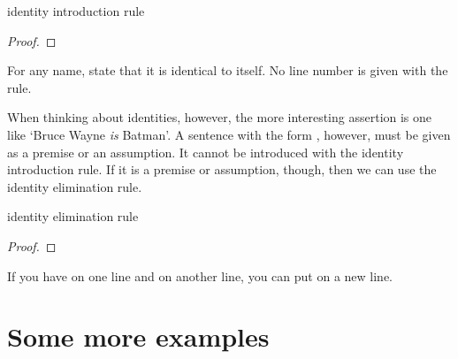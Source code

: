\begin{factboxy}{identity introduction rule}
\begin{proof}
	 \ii{}
\end{proof}

\small{For any name, state that it is identical to itself. No line number is given with the rule.}
\end{factboxy}

When thinking about identities, however, the more interesting assertion is one like `Bruce Wayne \textit{is} Batman'. A sentence with the form , however, must be given as a premise or an assumption. It cannot be introduced with the identity introduction rule. If it is a premise or assumption, though, then we can use the {identity elimination rule}.  

\begin{factboxy}{identity elimination rule}
\begin{proof}
	 
\end{proof}

\small{If you have  on one line and  on another line, you can put  on a new line.}
\end{factboxy}




\section{Some more examples}

